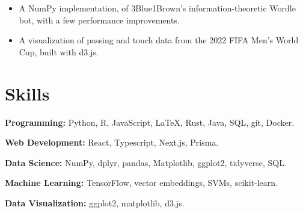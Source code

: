 \documentclass{ali-resume}
\begin{document}

\begin{itemize}
	\item A NumPy implementation, of 3Blue1Brown's information-theoretic Wordle bot, with a few performance improvements.
\end{itemize}


\begin{itemize}
	\item A visualization of passing and touch data from the 2022 FIFA Men's World Cup, built with d3.js.
\end{itemize}

\section{Skills}

\textbf{Programming:} Python, R, JavaScript, \LaTeX, Rust, Java, SQL, git, Docker.

\textbf{Web Development:} React, Typescript, Next.js, Prisma.

\textbf{Data Science:} NumPy, dplyr, pandas, Matplotlib, ggplot2, tidyverse, SQL.

\textbf{Machine Learning:} TensorFlow, vector embeddings, SVMs, scikit-learn.

\textbf{Data Visualization:} ggplot2, matplotlib, d3.js.

\end{document}
